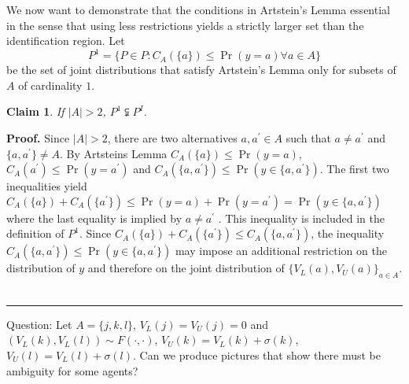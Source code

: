 \documentclass{article}
\newtheorem{claim}[theorem]{Claim}
\newenvironment{proof}[1][Proof]{\textbf{#1.} }{\ \rule{0.5em}{0.5em}}
\begin{document}
We now want to demonstrate that the conditions in Artstein's Lemma essential
in the sense that using less restrictions yields a strictly larger set than
the identification region. Let 
\begin{equation*}
P^{1}=\{P\in P:C_{A}(\{a\})\leq \Pr (y=a)\forall a\in A\}
\end{equation*}%
be the set of joint distributions that satisfy Artstein's Lemma only for
subsets of $A$ of cardinality $1$.

\begin{claim}
If $\vert A\vert >2$, $P^{1} \subsetneqq P^{I}$.
\end{claim}

\begin{proof}
Since $\vert A\vert >2$, there are two alternatives $a ,a^{ \prime } \in A$
such that $a \neq a^{ \prime }$ and $\{a ,a^{ \prime }\} \neq A$. By
Artsteins Lemma $C_{A} (\{a\}) \leq \Pr (y =a)$, $C_{A} (a^{ \prime }) \leq
\Pr (y =a^{ \prime })$ and $C_{A} (\{a ,a^{ \prime }\}) \leq \Pr (y \in \{a
,a^{ \prime }\})$. The first two inequalities yield $C_{A} (\{a\}) +C_{A}
(\{a^{ \prime }\}) \leq \Pr (y =a) +\Pr (y =a^{ \prime }) =\Pr (y \in \{a
,a^{ \prime }\})$ where the last equality is implied by $a \neq a^{ \prime }$%
. This inequality is included in the definition of $P^{1}$. Since $C_{A}
(\{a\}) +C_{A} (\{a^{ \prime }\}) \leq C_{A} (\{a ,a^{ \prime }\})$, the
inequality $C_{A} (\{a ,a^{ \prime }\}) \leq \Pr (y \in \{a ,a^{ \prime }\})$
may impose an additional restriction on the distribution of $y$ and
therefore on the joint distribution of $\{V_{L} (a) ,V_{U} (a)\}_{a \in A}$.
\end{proof}

Question: Let $A =\{j ,k ,l\}$, $V_{L} (j) =V_{U} (j) =0$ and $(V_{L} (k)
,V_{L} (l)) \sim F ( \cdot , \cdot )$, $V_{U} (k) =V_{L} (k) +\sigma (k)$, $%
V_{U} (l) =V_{L} (l) +\sigma (l)$. Can we produce pictures that show there
must be ambiguity for some agents?
\end{document}
